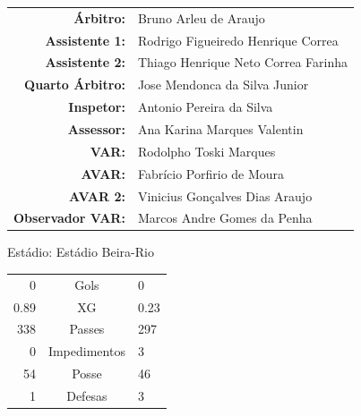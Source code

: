 \documentclass[11pt]{article}
\begin{document}
\vspace{0.5cm}
\begin{minipage}{0.65\textwidth}
\begin{center}
\begin{tabular}{rl}
\textbf{Árbitro:} & Bruno Arleu de Araujo \\
\textbf{Assistente 1:} & Rodrigo Figueiredo Henrique Correa \\
\textbf{Assistente 2:} & Thiago Henrique Neto Correa Farinha \\
\textbf{Quarto Árbitro:} & Jose Mendonca da Silva Junior \\
\textbf{Inspetor:} & Antonio Pereira da Silva \\
\textbf{Assessor:} & Ana Karina Marques Valentin \\
\textbf{VAR:} & Rodolpho Toski Marques \\
\textbf{AVAR:} & Fabrício Porfirio de Moura \\
\textbf{AVAR 2:} & Vinicius Gonçalves Dias Araujo \\
\textbf{Observador VAR:} & Marcos Andre Gomes da Penha \\
\end{tabular}
\end{center}
\end{minipage}
\begin{minipage}{0.3\textwidth}
Estádio: Estádio Beira-Rio\\
\begin{tabular}{rcl}
0 & Gols & 0 \\
0.89 & XG & 0.23 \\
338 & Passes & 297 \\
0 & Impedimentos & 3 \\
54 & Posse & 46 \\
1 & Defesas & 3 \\
\end{tabular}
\end{minipage}
\newpage
\end{document}
